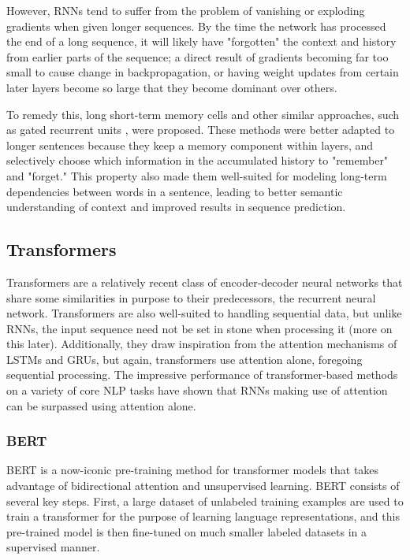 \documentclass[11pt,a4paper]{article}
\begin{document}
However, RNNs tend to suffer from the problem of vanishing or exploding gradients when given longer sequences. By the time the network has processed the end of a long sequence, it will likely have "forgotten" the context and history from earlier parts of the sequence; a direct result of gradients becoming far too small to cause change in backpropagation, or having weight updates from certain later layers become so large that they become dominant over others.

To remedy this, long short-term memory \cite{lstm} cells and other similar approaches, such as gated recurrent units \cite{gru}, were proposed. These methods were better adapted to longer sentences because they keep a memory component within layers, and selectively choose which information in the accumulated history to "remember" and "forget." This property also made them well-suited for modeling long-term dependencies between words in a sentence, leading to better semantic understanding of context and improved results in sequence prediction.

\subsection{Transformers}

Transformers \cite{transformer} are a relatively recent class of encoder-decoder neural networks that share some similarities in purpose to their predecessors, the recurrent neural network. Transformers are also well-suited to handling sequential data, but unlike RNNs, the input sequence need not be set in stone when processing it (more on this later). Additionally, they draw inspiration from the attention mechanisms of LSTMs and GRUs, but again, transformers use attention alone, foregoing sequential processing. The impressive performance of transformer-based methods on a variety of core NLP tasks have shown that RNNs making use of attention can be surpassed using attention alone.

\subsubsection{BERT}

BERT \cite{bert} is a now-iconic pre-training method for transformer models that takes advantage of bidirectional attention and unsupervised learning. BERT consists of several key steps. First, a large dataset of unlabeled training examples are used to train a transformer for the purpose of learning language representations, and this pre-trained model is then fine-tuned on much smaller labeled datasets in a supervised manner.
\end{document}
